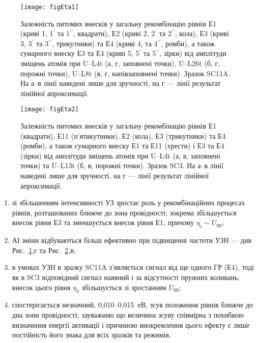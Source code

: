 \begin{figure}
\center
\texttt{[image: figEta1]}
\caption{\label{figEta1}
Залежність питомих внесків у загальну рекомбінацію рівнів
Е1 (криві 1, 1$^{\prime}$ та 1$^{\prime\prime}$, квадрати),
Е2 (криві 2, 2$^{\prime}$ та 2$^{\prime\prime}$, кола),
Е3 (криві 3, 3$^{\prime}$ та 3$^{\prime\prime}$, трикутники)
та Е4 (криві 4, та 4$^{\prime\prime}$, ромби),
а також сумарного внеску
Е3 та Е4 (криві 5, 5$^{\prime}$ та 5$^{\prime\prime}$, зірки)
від амплітуди зміщень атомів
при U--L4t (а, г, заповнені точки),
U--L26t (б, г, порожні точки),
U--L8t (в, г, напівзаповнені точки).
Зразок SC11A.
На а--в лінії наведені лише для зручності,
на г --- лінії результат лінійної апроксимації.
}%
\end{figure}

\begin{figure}
\center
\texttt{[image: figEta2]}
\caption{\label{figEta2}
Залежність питомих внесків у загальну рекомбінацію рівнів
Е1 (квадрати),
Е11 (п'ятикутники),
Е2 (кола),
Е3 (трикутники)
та Е4 (ромби),
а також сумарного внеску
Е1 та Е11 (хрести) і
Е3 та Е4 (зірки)
від амплітуди зміщень атомів
при U--L4t (а, в, заповнені точки) та
U--L13t (б, в, порожні точки).
Зразок SC3.
На а--в лінії наведені лише для зручності,
на г --- лінії результат лінійної апроксимації.
}%
\end{figure}

\begin{enumerate}[label=\asbuk*),leftmargin=0em,itemindent=1.5em]
\item зі збільшенням інтенсивності УЗ зростає роль у рекомбінаційних процесах рівнів, розташованих ближче до зона провідності; зокрема збільшується внесок рівня Е3 та зменшується внесок рівня Е1, причому
$\eta_i\sim U_\mathtt{US}$;
\item АІ зміни відбуваються більш ефективно при підвищенні частоти УЗН --- див Рис.~\ref{figEta1},г та Рис.~\ref{figEta2},в;
\item в умовах УЗН в зразку SC11A з'являється сигнал від ще одного ГР (Е4), тоді як в SC3 відповідний сигнал наявний і за відсутності пружних коливань; внесок цього рівня $\eta_4$ збільшується зі зростанням $U_\mathtt{US}$;
\item спостерігається незначний, 0,010--0,015~еВ, зсув положення рівнів ближче до дна зони провідності; зауважимо що величина зсуву співмірна з похибкою визначення енергії активації і причиною виокремлення цього ефекту є лише постійність його знака для всіх зразків та режимів.
\end{enumerate}

